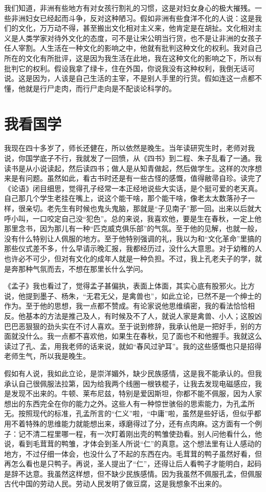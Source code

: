 我们知道，非洲有些地方有对女孩行割礼的习惯，这是对妇女身心的极大摧残。一些非洲妇女已经起而斗争，反对这种陋习。假如非洲有些食洋不化的人说：这是我们的文化，万万动不得，甚至搬出文化相对主义来，他肯定是在胡扯。文化相对主义是人类学家对待外文化的态度，可不是让宋公明当行货，也不是让非洲的女孩子任人宰割。人生活在一种文化的影响之中，他就有批判这种文化的权利。我对自己所在的文化有所批评，这是因为我生活在此地，我在这种文化的影响之下，所以有批判它的权利。假设我拿了绿卡，住在外国，你说我没有这种权利，我倒无话可说。这是因为，人该是自己生活的主宰，不是别人手里的行货。假如连这一点都不懂，他就是行尸走肉，而行尸走向是不配谈论科学的。

\chapter{我看国学}

我现在四十多岁了，师长还健在，所以依然是晚生。当年读研究生时，老师对我说，你国学底子不行，我就发了一回愤，从《四书》到二程、朱子乱看了一通。我读书是从小说读起，然后读四书；做人是从知青做起，然后做学生。这样的次序想来是有问题。虽然如此，看古书时还是有一些古怪的感慨，值得敝帚自珍。读完了《论语》闭目细思，觉得孔子经常一本正经地说些大实话，是个挺可爱的老天真。自己那几个学生老挂在嘴上，说这个能干啥，那个能干啥，像老太太数落孙子一样，很亲切。老先生有时候也鬼头鬼脑，那就是“子见南子”那一回。出来以后就大呼小叫，一口咬定自己没“犯色”。总的来说，我喜欢他，要是生在春秋，一定上他那里念书，因为那儿有一种“匹克威克俱乐部”的气氛。至于他的见解，也就一般，没有什么特别让人佩服的地方。至于他特别强调的礼，我以为和“文化革命”里搞的那些仪式差不多，什么早请示晚汇报，我都经历过，没什么大意思。对于幼稚的人也许必不可少，但对有文化的成年人就是一种负担。不过，我上孔老夫子的学，就是奔那种气氛而去，不想在那里长什么学问。 

《孟子》我也看过了，觉得孟子甚偏执，表面上体面，其实心底有股邪火。比方说，他提到墨子、杨朱，“无君无父，是禽兽也”，如此立论，已然不是一个绅士的作为。至于他的思想，我一点都不赞成。有论家说他思维缜密，我的看法恰恰相反。他基本的方法是推己及人，有时候及不了人，就说人家是禽兽、小人；这股凶巴巴恶狠狠的劲头实在不讨人喜欢。至于说到修辞，我承认他是一把好手，别的方面就没什么。我一点都不喜欢他，如果生在春秋，见了面也不和他握手。我就这么读过了孔、孟，用我老师的话来说，就如“春风过驴耳”。我的这些感慨也只是招得老师生气，所以我是晚生。 

假如有人说，我如此立论，是崇洋媚外，缺少民族感情，这是我不能承认的。但我承认自己很佩服法拉第，因为给我两个线圈一根铁棍子，让我去发现电磁感应，我是发现不出来的。牛顿、莱布尼兹，特别是爱因斯坦，你都不能不佩服，因为人家想出的东西完全在你的能力之外。这些人有一种惊世骇俗的思索能力，为孔孟所无。按照现代的标准，孔孟所言的“仁义”啦，“中庸”啦，虽然是些好话，但似乎都用不着特殊的思维能力就能想出来，琢磨得过了分，还有点肉麻。这方面有一个例子：记不清二程里哪一程，有一次盯着刚出壳的鸭雏使劲看。别人问他看什么，他说，看到毛茸茸的鸭雏，才体会到圣人所说“仁”的真意。这个想法里有让人感动的地方，不过仔细一体会，也没什么了不起的东西在内。毛茸茸的鸭子虽然好看，但再怎么看也是只鸭子。再说，圣人提出了“仁”，还得让后人看鸭子才能明白，起码是辞不达意。我虽然这样想，但不缺少民族感情。因为我虽然不佩服孔孟，但佩服古代中国的劳动人民。劳动人民发明了做豆腐，这是我想象不出来的。 

